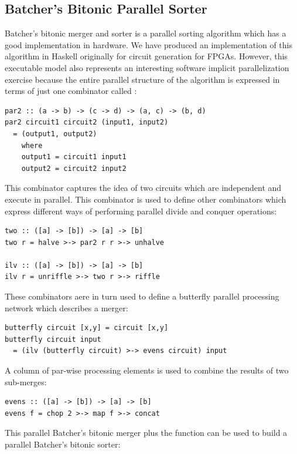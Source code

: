 \subsection{Batcher's Bitonic Parallel Sorter}
Batcher's bitonic merger and sorter is a parallel sorting algorithm which has a good implementation in hardware. We have produced an implementation of this algorithm in Haskell originally for circuit generation for FPGAs. However, this executable model also represents an interesting software implicit parallelization exercise because the entire parallel structure of the algorithm is expressed in terms of just one combinator called :

\begin{lstlisting}
par2 :: (a -> b) -> (c -> d) -> (a, c) -> (b, d)
par2 circuit1 circuit2 (input1, input2)
  = (output1, output2)
    where
    output1 = circuit1 input1
    output2 = circuit2 input2
\end{lstlisting}

This combinator captures the idea of two circuits which are independent and execute in parallel. This combinator is used to define other combinators which express different ways of performing parallel divide and conquer operations:

\begin{lstlisting}
two :: ([a] -> [b]) -> [a] -> [b]
two r = halve >-> par2 r r >-> unhalve

ilv :: ([a] -> [b]) -> [a] -> [b]
ilv r = unriffle >-> two r >-> riffle
\end{lstlisting}

These combinators aere in turn used to define a butterfly parallel processing network which describes a merger:

\begin{lstlisting}
butterfly circuit [x,y] = circuit [x,y]
butterfly circuit input
  = (ilv (butterfly circuit) >-> evens circuit) input
\end{lstlisting}

A column of par-wise processing elements is used to combine the results of two sub-merges:

\begin{lstlisting}
evens :: ([a] -> [b]) -> [a] -> [b]
evens f = chop 2 >-> map f >-> concat
\end{lstlisting}

This parallel Batcher's bitonic merger plus the  function can be used to build a parallel Batcher's bitonic sorter:

